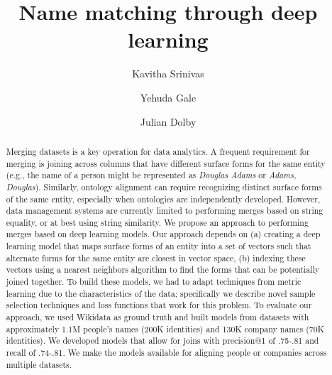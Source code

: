 \documentclass[runningheads]{llncs}
\begin{document}
%
\title{Name matching through deep learning}
%
%
\author{Kavitha Srinivas \and
Yehuda Gale \and
Julian Dolby}
%
%

%
\maketitle              %
%
\begin{abstract}
Merging datasets is a key operation for data analytics.  A frequent
requirement for merging is joining across columns that have
different surface forms for the same entity (e.g., the name of a
person might be represented as \textit{Douglas Adams} or
\textit{Adams, Douglas}).  Similarly,
ontology alignment can require recognizing distinct surface forms of
the same entity, especially when ontologies are independently
developed.  However, data management systems are currently limited
to performing merges based on string equality, or at best using
string similarity.  We propose an approach to performing merges
based on deep learning models.  Our approach depends on (a) creating
a deep learning model that maps surface forms of an entity into a
set of vectors such that alternate forms for the same entity are
closest in vector space, (b) indexing these vectors using a nearest
neighbors algorithm to find the forms that can be potentially joined
together.  To build these models, we had to adapt techniques from
metric learning due to the characteristics of the data; specifically we describe 
novel sample selection techniques and loss functions that work for this problem.  
To evaluate our approach, we used Wikidata as ground truth
and built models from datasets with approximately 1.1M people's names
(200K identities) and 130K company names (70K identities).  We developed models that 
allow for joins with precision@1 of .75-.81 and
recall of .74-.81.  We make the models available for aligning people or companies across multiple datasets.  

\end{abstract}
%
%
%








%
%
%


 
\end{document}
